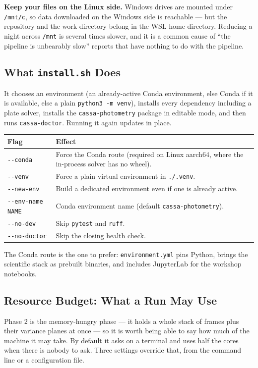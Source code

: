 \documentclass[11pt,a4paper]{article}
\begin{document}
\begin{mdframed}[backgroundcolor=procbg, linecolor=accent, linewidth=1.5pt, roundcorner=4pt]
\textbf{Keep your files on the Linux side.} Windows drives are mounted under
\texttt{/mnt/c}, so data downloaded on the Windows side is reachable --- but the
repository and the work directory belong in the WSL home directory. Reducing a
night across \texttt{/mnt} is several times slower, and it is a common cause of
``the pipeline is unbearably slow'' reports that have nothing to do with the
pipeline.
\end{mdframed}

\subsection{What \texttt{install.sh} Does}
It chooses an environment (an already-active Conda environment, else Conda if it
is available, else a plain \texttt{python3 -m venv}), installs every dependency
including a plate solver, installs the \texttt{cassa-photometry} package in
editable mode, and then runs \texttt{cassa-doctor}. Running it again updates in
place.

\begin{center}
\begin{tabularx}{\textwidth}{|l|X|}
\hline
\textbf{Flag} & \textbf{Effect} \\
\hline
\texttt{-{}-conda} & Force the Conda route (required on Linux aarch64, where the in-process solver has no wheel). \\
\hline
\texttt{-{}-venv} & Force a plain virtual environment in \texttt{./.venv}. \\
\hline
\texttt{-{}-new-env} & Build a dedicated environment even if one is already active. \\
\hline
\texttt{-{}-env-name NAME} & Conda environment name (default \texttt{cassa-photometry}). \\
\hline
\texttt{-{}-no-dev} & Skip \texttt{pytest} and \texttt{ruff}. \\
\hline
\texttt{-{}-no-doctor} & Skip the closing health check. \\
\hline
\end{tabularx}
\end{center}

The Conda route is the one to prefer: \texttt{environment.yml} pins Python,
brings the scientific stack as prebuilt binaries, and includes JupyterLab for
the workshop notebooks.

\subsection{Resource Budget: What a Run May Use}
Phase 2 is the memory-hungry phase --- it holds a whole stack of frames plus
their variance planes at once --- so it is worth being able to say how much of
the machine it may take. By default it asks on a terminal and uses half the
cores when there is nobody to ask. Three settings override that, from the
command line or a configuration file.
\end{document}
